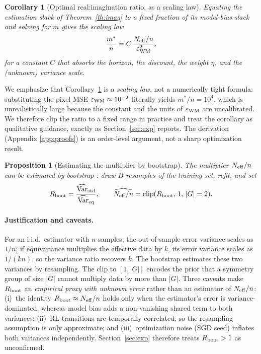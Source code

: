 \documentclass[preprint,12pt]{elsarticle}
\newtheorem{corollary}[theorem]{Corollary}
\newtheorem{proposition}{Proposition}
\begin{document}
\begin{corollary}[Optimal real:imagination ratio, as a scaling law]\label{cor:ratio}
Equating the estimation slack of Theorem~\ref{th:imag} to a fixed fraction
of its model-bias slack and solving for $m$ gives the scaling law
\begin{equation}
  \frac{m^*}{n}=C\,\frac{N_{\rm eff}/n}{\varepsilon_{\rm WM}^{2}},
\end{equation}
for a constant $C$ that absorbs the horizon, the discount, the weight
$\eta$, and the (unknown) variance scale.
\end{corollary}

We emphasize that Corollary~\ref{cor:ratio} is a \emph{scaling law}, not a
numerically tight formula: substituting the pixel MSE
$\varepsilon_{\rm WM}\approx10^{-2}$ literally yields $m^*/n=10^4$, which is
unrealistically large because the constant and the units of
$\varepsilon_{\rm WM}$ are uncalibrated. We therefore clip the ratio to a
fixed range in practice and treat the corollary as qualitative guidance,
exactly as Section~\ref{sec:exp} reports. The derivation (Appendix
\ref{app:proofs}) is an order-level argument, not a sharp optimization
result.

\begin{proposition}[Estimating the multiplier by bootstrap]\label{prop:meff}
The multiplier $N_{\rm eff}/n$ can be estimated by bootstrap
\cite{bootstrap1993}: draw $B$ resamples of the training set, refit, and set
\begin{equation}
  R_{\rm boot}=\frac{\widehat{\operatorname{Var}}_{\rm std}}{\widehat{\operatorname{Var}}_{\rm eq}},
  \qquad
  \widehat{N_{\rm eff}/n}=\operatorname{clip}(R_{\rm boot},\,1,\,|G|=2).
\end{equation}
\end{proposition}

\paragraph{Justification and caveats.}
For an i.i.d.\ estimator with $n$ samples, the out-of-sample error variance
scales as $1/n$; if equivariance multiplies the effective data by $k$, its
error variance scales as $1/(kn)$, so the variance ratio recovers $k$. The
bootstrap \cite{bootstrap1993} estimates these two variances by resampling.
The clip to $[1,|G|]$ encodes the prior that a symmetry group of size $|G|$
cannot multiply data by more than $|G|$. Three caveats make $R_{\rm boot}$ an
\emph{empirical proxy with unknown error} rather than an estimator of
$N_{\rm eff}/n$: (i)~the identity $R_{\rm boot}\approx N_{\rm eff}/n$ holds
only when the estimator's error is variance-dominated, whereas model bias
adds a non-vanishing shared term to both variances; (ii)~RL transitions are
temporally correlated, so the resampling assumption is only approximate; and
(iii)~optimization noise (SGD seed) inflates both variances independently.
Section~\ref{sec:exp} therefore treats $R_{\rm boot}>1$ as unconfirmed.
\end{document}
